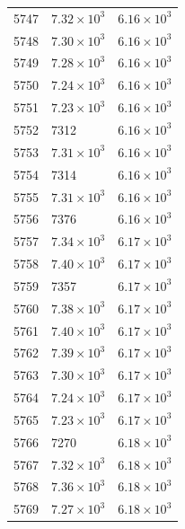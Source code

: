 \begin{table}[H]
\begin{tabular}{lll}
5747 & $\displaystyle 7.32 \times 10^{3}$ & $\displaystyle 6.16 \times 10^{3}$ \\
5748 & $\displaystyle 7.30 \times 10^{3}$ & $\displaystyle 6.16 \times 10^{3}$ \\
5749 & $\displaystyle 7.28 \times 10^{3}$ & $\displaystyle 6.16 \times 10^{3}$ \\
5750 & $\displaystyle 7.24 \times 10^{3}$ & $\displaystyle 6.16 \times 10^{3}$ \\
5751 & $\displaystyle 7.23 \times 10^{3}$ & $\displaystyle 6.16 \times 10^{3}$ \\
5752 & 7312 & $\displaystyle 6.16 \times 10^{3}$ \\
5753 & $\displaystyle 7.31 \times 10^{3}$ & $\displaystyle 6.16 \times 10^{3}$ \\
5754 & 7314 & $\displaystyle 6.16 \times 10^{3}$ \\
5755 & $\displaystyle 7.31 \times 10^{3}$ & $\displaystyle 6.16 \times 10^{3}$ \\
5756 & 7376 & $\displaystyle 6.16 \times 10^{3}$ \\
5757 & $\displaystyle 7.34 \times 10^{3}$ & $\displaystyle 6.17 \times 10^{3}$ \\
5758 & $\displaystyle 7.40 \times 10^{3}$ & $\displaystyle 6.17 \times 10^{3}$ \\
5759 & 7357 & $\displaystyle 6.17 \times 10^{3}$ \\
5760 & $\displaystyle 7.38 \times 10^{3}$ & $\displaystyle 6.17 \times 10^{3}$ \\
5761 & $\displaystyle 7.40 \times 10^{3}$ & $\displaystyle 6.17 \times 10^{3}$ \\
5762 & $\displaystyle 7.39 \times 10^{3}$ & $\displaystyle 6.17 \times 10^{3}$ \\
5763 & $\displaystyle 7.30 \times 10^{3}$ & $\displaystyle 6.17 \times 10^{3}$ \\
5764 & $\displaystyle 7.24 \times 10^{3}$ & $\displaystyle 6.17 \times 10^{3}$ \\
5765 & $\displaystyle 7.23 \times 10^{3}$ & $\displaystyle 6.17 \times 10^{3}$ \\
5766 & 7270 & $\displaystyle 6.18 \times 10^{3}$ \\
5767 & $\displaystyle 7.32 \times 10^{3}$ & $\displaystyle 6.18 \times 10^{3}$ \\
5768 & $\displaystyle 7.36 \times 10^{3}$ & $\displaystyle 6.18 \times 10^{3}$ \\
5769 & $\displaystyle 7.27 \times 10^{3}$ & $\displaystyle 6.18 \times 10^{3}$ \\

\end{tabular}
\end{table}
